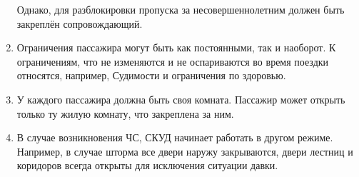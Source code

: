 \begin{enumerate}
	Однако, для разблокировки пропуска за несовершеннолетним должен быть закреплён сопровождающий.
	\item Ограничения пассажира могут быть как постоянными, так и наоборот. К ограничениям, что не изменяются и не оспариваются во время поездки относятся, например, Судимости и ограничения по здоровью.
	\item У каждого пассажира должна быть своя комната. Пассажир может открыть только ту жилую комнату, что закреплена за ним.
	\item В случае возникновения ЧС, СКУД начинает работать в другом режиме.
	Например, в случае шторма все двери наружу закрываются, двери лестниц и коридоров всегда открыты для исключения ситуации давки.
\end{enumerate}  